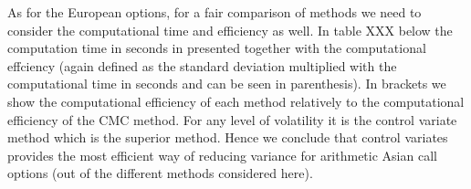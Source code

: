 \documentclass[11pt,a4paper,oneside]{article}
\begin{document}
As for the European options, for a fair comparison of methods we need to consider the computational time and efficiency as well. In table XXX below the computation time in seconds in presented together with the computational effciency (again defined as the standard deviation multiplied with the computational time in seconds and can be seen in parenthesis). In brackets we show the computational efficiency of each method relatively to the computational efficiency of the CMC method. For any level of volatility it is the control variate method which is the superior method. Hence we conclude that control variates provides the most efficient way of reducing variance for arithmetic Asian call options (out of the different methods considered here).    



\begin{table}[ht]
\centering
\captionsetup{justification=centering,margin=0.6cm}
\caption{\textbf{Computational time and efficiency}}
\end{table}
\end{document}

